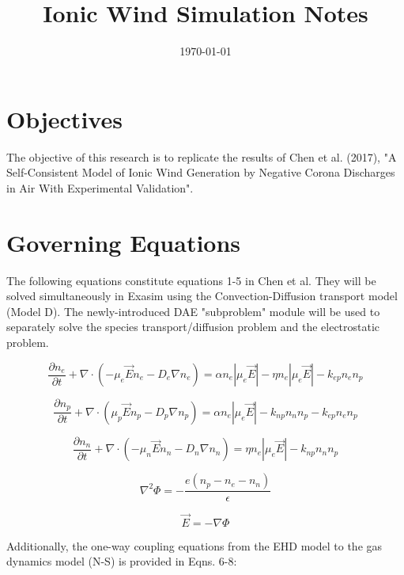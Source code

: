 \documentclass[12pt, a4paper]{report}
\begin{document}
\title{Ionic Wind Simulation Notes}
\date{\today}
\maketitle

\noindent

\section{Objectives}
The objective of this research is to replicate the results of Chen et al. (2017), "A Self-Consistent Model of Ionic Wind Generation by Negative Corona Discharges in Air With Experimental Validation".

\section{Governing Equations}
The following equations constitute equations 1-5 in Chen et al. They will be solved simultaneously in Exasim using the Convection-Diffusion transport model (Model D). The newly-introduced DAE "subproblem" module will be used to separately solve the species transport/diffusion problem and the electrostatic problem.

\begin{equation}
    \frac{\partial n_e}{\partial t} + \nabla \cdot (-\mu_e\vec{E}n_e - D_e\nabla n_e) = \alpha n_e|\mu_e\vec{E}| -\eta n_e|\mu_e\vec{E}| - k_{ep}n_en_p
\end{equation}

\begin{equation}
    \frac{\partial n_p}{\partial t} + \nabla \cdot (\mu_p\vec{E}n_p - D_p\nabla n_p) = \alpha n_e|\mu_e\vec{E}| - k_{np}n_nn_p - k_{ep}n_en_p
\end{equation}

\begin{equation}
    \frac{\partial n_n}{\partial t} + \nabla \cdot (-\mu_n\vec{E}n_n - D_n\nabla n_n) = \eta n_e|\mu_e\vec{E}| - k_{np}n_nn_p
\end{equation}

\begin{equation}
    \nabla^2\Phi = -\frac{e(n_p-n_e-n_n)}{\epsilon}
\end{equation}

\begin{equation}
    \vec{E} = -\nabla\Phi
\end{equation}

Additionally, the one-way coupling equations from the EHD model to the gas dynamics model (N-S) is provided in Eqns. 6-8:
\end{document}
